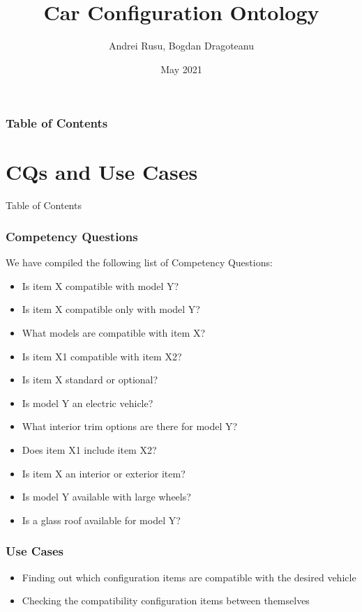 \documentclass{beamer}
\title{Car Configuration Ontology}
\author{Andrei Rusu, Bogdan Dragoteanu}
\institute{Technical University of Cluj-Napoca}
\date{May 2021}
\begin{document}
\frame{\titlepage}

\begin{frame}
\frametitle{Table of Contents}
\tableofcontents
\end{frame}

\section{CQs and Use Cases}

\begin{frame}{Table of Contents}
    \tableofcontents[currentsection]
\end{frame}

\begin{frame}

\frametitle{Competency Questions}

We have compiled the following list of Competency Questions:

\begin{itemize}
\item Is item X compatible with model Y?
\item Is item X compatible only with model Y?
\item What models are compatible with item X?
\item Is item X1 compatible with item X2?
\item Is item X standard or optional?
\item Is model Y an electric vehicle?
\item What interior trim options are there for model Y?
\item Does item X1 include item X2?
\item Is item X an interior or exterior item?
\item Is model Y available with large wheels?
\item Is a glass roof available for model Y?
\end{itemize}
\end{frame}

\begin{frame}
\frametitle{Use Cases}
\begin{itemize}
    \item Finding out which configuration items are compatible with the desired vehicle
    \item Checking the compatibility configuration items between themselves
\end{itemize}
\end{frame}
\end{document}

